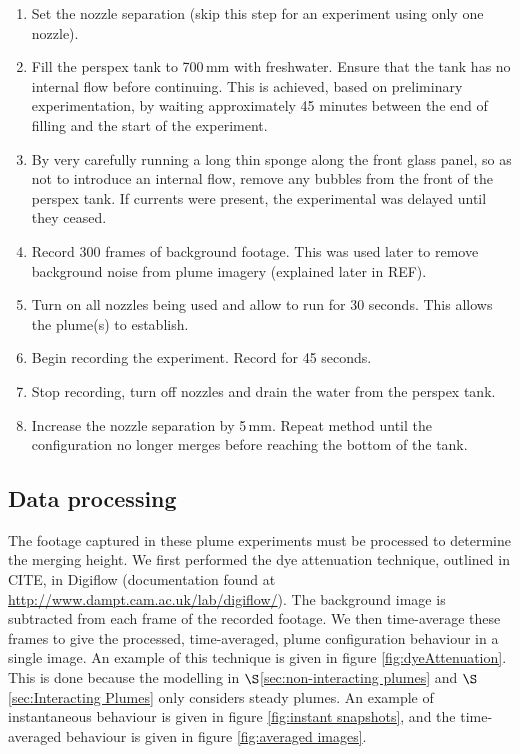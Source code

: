 \documentclass{jfm}
\begin{document}
	\begin{enumerate}
		\item Set the nozzle separation (skip this step for an experiment using only one nozzle).
		\item Fill the perspex tank to 700\,mm with freshwater. Ensure that the tank has no internal flow before continuing. This is achieved, based on preliminary experimentation, by waiting approximately 45 minutes between the end of filling and the start of the experiment.
		\item By very carefully running a long thin sponge along the front glass panel, so as not to introduce an internal flow, remove any bubbles from the front of the perspex tank. If currents were present, the experimental was delayed until they ceased.
		\item Record 300 frames of background footage. This was used later to remove background noise from plume imagery (explained later in REF).
		\item Turn on all nozzles being used and allow to run for 30 seconds. This allows the plume(s) to establish.
		\item Begin recording the experiment. Record for 45 seconds.
		\item Stop recording, turn off nozzles and drain the water from the perspex tank.
		\item Increase the nozzle separation by 5\,mm. Repeat method until the configuration no longer merges before reaching the bottom of the tank.
	\end{enumerate}
	\subsection{Data processing}\label{subsec:Data processing}
	The footage captured in these plume experiments must be processed to determine the merging height. We first performed the dye attenuation technique, outlined in CITE, in Digiflow (documentation found at \url{http://www.dampt.cam.ac.uk/lab/digiflow/}). The background image is subtracted from each frame of the recorded footage. We then time-average these frames to give the processed, time-averaged, plume configuration behaviour in a single image. An example of this technique is given in figure \ref{fig:dyeAttenuation}. This is done because the modelling in $\S$\ref{sec:non-interacting plumes}  and $\S$\ref{sec:Interacting Plumes} only considers steady plumes. An example of instantaneous behaviour is given in figure \ref{fig:instant snapshots}, and the time-averaged behaviour is given in figure \ref{fig:averaged images}. \\
	
\end{document}
